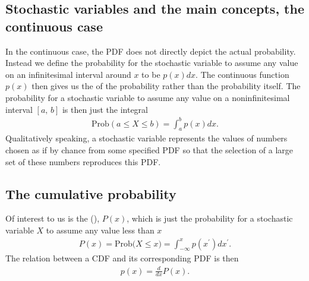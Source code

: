 \documentclass[letterpaper,10pt,english]{sphinxmanual}
\begin{document}
\subsection{Stochastic variables and the main concepts, the continuous case}
\label{\detokenize{chapter2:stochastic-variables-and-the-main-concepts-the-continuous-case}}
In the continuous case, the PDF does not directly depict the
actual probability. Instead we define the probability for the
stochastic variable to assume any value on an infinitesimal interval
around \(x\) to be \(p(x)dx\). The continuous function \(p(x)\) then gives us
the  of the probability rather than the probability
itself. The probability for a stochastic variable to assume any value
on a non\sphinxhyphen{}infinitesimal interval \([a,\,b]\) is then just the integral
\begin{equation*}
\begin{split}
\mathrm{Prob}(a\leq X\leq b) = \int_a^b p(x)dx.
\end{split}
\end{equation*}
Qualitatively speaking, a stochastic variable represents the values of
numbers chosen as if by chance from some specified PDF so that the
selection of a large set of these numbers reproduces this PDF.


\subsection{The cumulative probability}
\label{\detokenize{chapter2:the-cumulative-probability}}
Of interest to us is the  (), \(P(x)\), which is just the probability
for a stochastic variable \(X\) to assume any value less than \(x\)
\begin{equation*}
\begin{split}
P(x)=\mathrm{Prob(}X\leq x\mathrm{)} =
\int_{-\infty}^x p(x^{\prime})dx^{\prime}.
\end{split}
\end{equation*}
The relation between a CDF and its corresponding PDF is then
\begin{equation*}
\begin{split}
p(x) = \frac{d}{dx}P(x).
\end{split}
\end{equation*}
\end{document}
